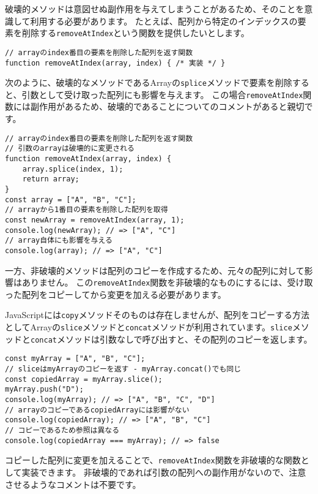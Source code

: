 破壊的メソッドは意図せぬ副作用を与えてしまうことがあるため、そのことを意識して利用する必要があります。
たとえば、配列から特定のインデックスの要素を削除する\texttt{removeAtIndex}という関数を提供したいとします。

\begin{lstlisting}
// arrayのindex番目の要素を削除した配列を返す関数
function removeAtIndex(array, index) { /* 実装 */ }
\end{lstlisting}

次のように、破壊的なメソッドであるArrayの\texttt{splice}メソッドで要素を削除すると、引数として受け取った配列にも影響を与えます。
この場合\texttt{removeAtIndex}関数には副作用があるため、破壊的であることについてのコメントがあると親切です。

\begin{lstlisting}
// arrayのindex番目の要素を削除した配列を返す関数
// 引数のarrayは破壊的に変更される
function removeAtIndex(array, index) {
    array.splice(index, 1);
    return array;
}
const array = ["A", "B", "C"];
// arrayから1番目の要素を削除した配列を取得
const newArray = removeAtIndex(array, 1);
console.log(newArray); // => ["A", "C"]
// array自体にも影響を与える
console.log(array); // => ["A", "C"]
\end{lstlisting}

一方、非破壊的メソッドは配列のコピーを作成するため、元々の配列に対して影響はありません。
この\texttt{removeAtIndex}関数を非破壊的なものにするには、受け取った配列をコピーしてから変更を加える必要があります。

JavaScriptには\texttt{copy}メソッドそのものは存在しませんが、配列をコピーする方法としてArrayの\texttt{slice}メソッドと\texttt{concat}メソッドが利用されています。\texttt{slice}メソッドと\texttt{concat}メソッドは引数なしで呼び出すと、その配列のコピーを返します。

\begin{lstlisting}
const myArray = ["A", "B", "C"];
// sliceはmyArrayのコピーを返す - myArray.concat()でも同じ
const copiedArray = myArray.slice();
myArray.push("D");
console.log(myArray); // => ["A", "B", "C", "D"]
// arrayのコピーであるcopiedArrayには影響がない
console.log(copiedArray); // => ["A", "B", "C"]
// コピーであるため参照は異なる
console.log(copiedArray === myArray); // => false
\end{lstlisting}

コピーした配列に変更を加えることで、\texttt{removeAtIndex}関数を非破壊的な関数として実装できます。
非破壊的であれば引数の配列への副作用がないので、注意させるようなコメントは不要です。


